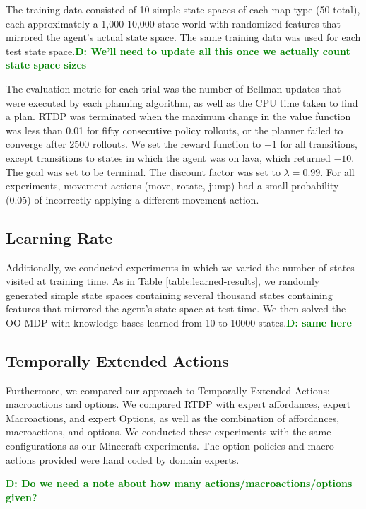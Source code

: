 \documentclass[conference]{IEEEtran}
\newcommand{\dnote}[1]{\textcolor{Green}{\textbf{D: #1}}}
\begin{document}
The training data consisted of 10 simple state spaces of each map type
(50 total), each approximately a 1,000-10,000 state world with randomized
features that mirrored the agent's actual state space. The same training data
was used for each test state space.\dnote{We'll need to update all this once
we actually count state space sizes}

The evaluation metric for each trial was the
number of Bellman updates that were executed by each planning
algorithm, as well as the CPU time taken to find a plan. RTDP was terminated
when the maximum change in the value function was less than 0.01 for fifty 
consecutive policy rollouts, or the planner failed to converge after 2500 rollouts. 
We set the reward  function to $-1$ for all transitions, except transitions to states in 
which the agent was on lava, which returned $-10$. The goal was set to be 
terminal. The discount factor was set to $\lambda = 0.99$. For all experiments,
movement actions (move, rotate, jump) had a small probability (0.05) of 
incorrectly applying a different movement action.

\subsection{Learning Rate}
Additionally, we conducted experiments in which we varied the number of states visited at training time. 
As in Table \ref{table:learned-results}, we randomly generated simple state spaces
containing several thousand states containing features that mirrored the agent's state
space at test time. We then solved the OO-MDP with knowledge bases learned from 
10 to 10000 states.\dnote{same here}

\subsection{Temporally Extended Actions}
Furthermore, we compared our approach to Temporally Extended Actions: 
macroactions and options. We compared RTDP with expert affordances, 
expert Macroactions, and expert Options, as well as the combination of 
affordances, macroactions, and options. We conducted these experiments 
with the same configurations as our Minecraft experiments. The option policies
and macro actions provided were hand coded by domain experts.

\dnote{Do we need a note about how many actions/macroactions/options given?}
\end{document}

